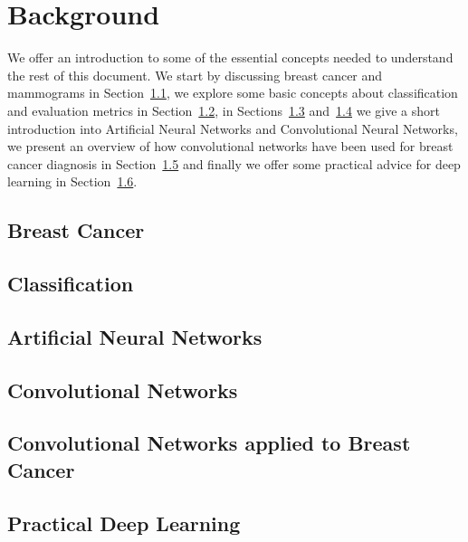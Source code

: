 \chapter{Background}
\label{ch:Background}
We offer an introduction to some of the essential concepts needed to understand the rest of this document. We start by discussing breast cancer and mammograms in Section~\ref{sec:BreastCancer}, we explore some basic concepts about classification and evaluation metrics in Section~\ref{sec:Classification}, in Sections~\ref{sec:ANNs} and~\ref{sec:ConvNets} we give a short introduction into Artificial Neural Networks and Convolutional Neural Networks, we present an overview of how convolutional networks have been used for breast cancer diagnosis in Section~\ref{sec:BreastCancerConvNets} and finally we offer some practical advice for deep learning in Section~\ref{sec:PracticalDL}.

\section{Breast Cancer}
\label{sec:BreastCancer}


\section{Classification}
\label{sec:Classification}


\section{Artificial Neural Networks}
\label{sec:ANNs}


\section{Convolutional Networks}
\label{sec:ConvNets}


\section{Convolutional Networks applied to Breast Cancer}
\label{sec:BreastCancerConvNets}


\section{Practical Deep Learning}
\label{sec:PracticalDL}

